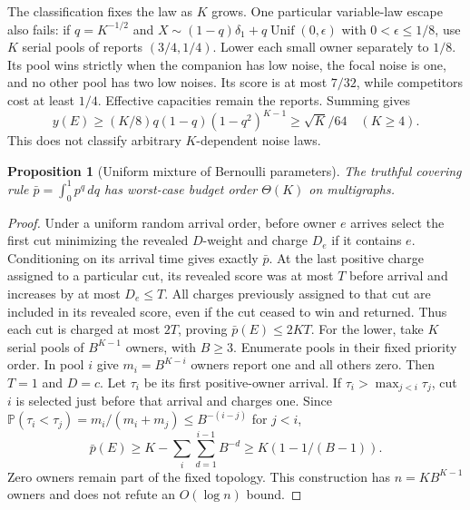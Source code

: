 \documentclass[11pt]{article}
\newtheorem{proposition}[theorem]{Proposition}
\theoremstyle{definition}\newtheorem{definition}[theorem]{Definition}
\theoremstyle{remark}\newtheorem{remark}[theorem]{Remark}
\newcommand{\Prob}{\mathbb P}
\begin{document}
The classification fixes the law as $K$ grows. One particular variable-law
escape also fails: if $q=K^{-1/2}$ and
$X\sim(1-q)\delta_1+q\operatorname{Unif}(0,\epsilon)$ with
$0<\epsilon\le1/8$, use $K$ serial pools of reports $(3/4,1/4)$.
Lower each small owner separately to $1/8$. Its pool wins strictly when
the companion has low noise, the focal noise is one, and no other pool has
two low noises. Its score is at most $7/32$, while competitors cost at least
$1/4$. Effective capacities remain the reports. Summing gives
\[
 y(E)\ge(K/8)q(1-q)(1-q^2)^{K-1}\ge\sqrt K/64\quad(K\ge4).
\]
This does not classify arbitrary $K$-dependent noise laws.

\begin{proposition}[Uniform mixture of Bernoulli parameters]\label{noise:uniform-mixture}
The truthful covering rule $\bar p=\int_0^1p^q\,dq$ has worst-case
budget order $\Theta(K)$ on multigraphs.
\end{proposition}
\begin{proof}
Under a uniform random arrival order, before owner $e$ arrives select the
first cut minimizing the revealed $D$-weight and charge $D_e$ if it contains
$e$. Conditioning on its arrival time gives exactly $\bar p$.
At the last positive charge assigned to a particular cut, its revealed score
was at most $T$ before arrival and increases by at most $D_e\le T$.
All charges previously assigned to that cut are included in its revealed
score, even if the cut ceased to win and returned. Thus each cut is charged
at most $2T$, proving $\bar p(E)\le2KT$.
For the lower, take $K$ serial pools of $B^{K-1}$ owners, with $B\ge3$.
Enumerate pools in their fixed priority order. In pool $i$ give
$m_i=B^{K-i}$ owners report one and all others zero. Then $T=1$ and $D=c$.
Let $\tau_i$ be its first positive-owner arrival. If
$\tau_i>\max_{j<i}\tau_j$, cut $i$ is selected just before that arrival
and charges one. Since
$\Prob(\tau_i<\tau_j)=m_i/(m_i+m_j)\le B^{-(i-j)}$ for $j<i$,
\[
 \bar p(E)\ge K-\sum_i\sum_{d=1}^{i-1}B^{-d}
             \ge K(1-1/(B-1)).
\]
Zero owners remain part of the fixed topology. This construction has
$n=KB^{K-1}$ owners and does not refute an $O(\log n)$ bound.
\end{proof}
\end{document}
